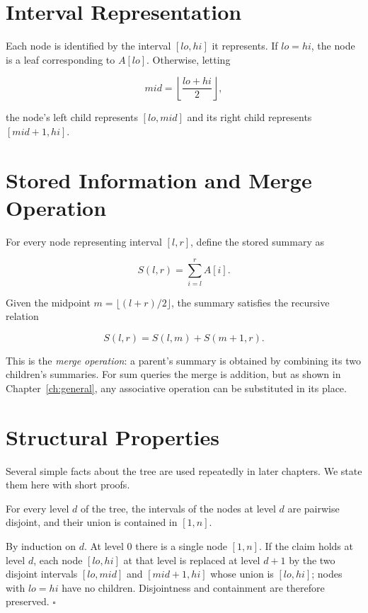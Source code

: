 \documentclass[
  11pt,
  a4paper,
  twoside=false,
  numbers=noenddot,
  headings=big,
  parskip=half,
  toc=bibliography,
  toc=listof,
  bibliography=totoc
]{scrreprt}
\newenvironment{proof}[1][Proof]{\par\noindent{\bfseries\sffamily\color{navy}#1.}\enspace}{\hfill$\square$\par\medskip}
\begin{document}
\section{Interval Representation}
Each node is identified by the interval $[lo, hi]$ it represents. If $lo = hi$, the node is a leaf corresponding to $A[lo]$. Otherwise, letting

\begin{equation}
mid = \left\lfloor \frac{lo+hi}{2} \right\rfloor,
\end{equation}

the node's left child represents $[lo, mid]$ and its right child represents $[mid+1, hi]$.

\section{Stored Information and Merge Operation}
For every node representing interval $[l,r]$, define the stored summary as

\begin{equation}
S(l,r) = \sum_{i=l}^{r} A[i].
\end{equation}

Given the midpoint $m = \lfloor (l+r)/2 \rfloor$, the summary satisfies the recursive relation

\begin{equation}
S(l,r) = S(l,m) + S(m+1,r).
\label{eq:merge}
\end{equation}

This is the \emph{merge operation}: a parent's summary is obtained by combining its two children's summaries. For sum queries the merge is addition, but as shown in Chapter~\ref{ch:general}, any associative operation can be substituted in its place.

\section{Structural Properties}
Several simple facts about the tree are used repeatedly in later chapters. We state them here with short proofs.

\begin{lem}\label{lem:partition}
For every level $d$ of the tree, the intervals of the nodes at level $d$ are pairwise disjoint, and their union is contained in $[1,n]$.
\end{lem}
\begin{proof}
By induction on $d$. At level $0$ there is a single node $[1,n]$. If the claim holds at level $d$, each node $[lo,hi]$ at that level is replaced at level $d+1$ by the two disjoint intervals $[lo,mid]$ and $[mid+1,hi]$ whose union is $[lo,hi]$; nodes with $lo=hi$ have no children. Disjointness and containment are therefore preserved.
\end{proof}
\end{document}
